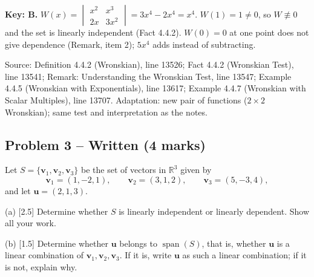 \documentclass[11pt,a4paper]{article}
\newcommand{\Src}[1]{{\footnotesize\color{black!65}Source: #1}}
\begin{document}
\textbf{Key: B.} $W(x)=\begin{vmatrix}x^{2}&x^{3}\\2x&3x^{2}\end{vmatrix}=3x^{4}-2x^{4}=x^{4}$. $W(1)=1\neq0$, so $W\not\equiv0$ and the set is linearly independent (Fact 4.4.2). $W(0)=0$ at one point does not give dependence (Remark, item 2); $5x^4$ adds instead of subtracting.\par
\Src{Definition 4.4.2 (Wronskian), line 13526; Fact 4.4.2 (Wronskian Test), line 13541; Remark: Understanding the Wronskian Test, line 13547; Example 4.4.5 (Wronskian with Exponentials), line 13617; Example 4.4.7 (Wronskian with Scalar Multiples), line 13707. Adaptation: new pair of functions ($2\times2$ Wronskian); same test and interpretation as the notes.}\par
\subsection*{Problem 3 -- Written (4 marks)}
Let $S=\{\mathbf{v}_1,\mathbf{v}_2,\mathbf{v}_3\}$ be the set of vectors in $\mathbb{R}^3$ given by\[\mathbf{v}_1=(1,-2,1),\qquad \mathbf{v}_2=(3,1,2),\qquad \mathbf{v}_3=(5,-3,4),\]and let $\mathbf{u}=(2,1,3)$.\par (a) [2.5] Determine whether $S$ is linearly independent or linearly dependent. Show all your work.\par (b) [1.5] Determine whether $\mathbf{u}$ belongs to $\operatorname{span}(S)$, that is, whether $\mathbf{u}$ is a linear combination of $\mathbf{v}_1,\mathbf{v}_2,\mathbf{v}_3$. If it is, write $\mathbf{u}$ as such a linear combination; if it is not, explain why.\par
\end{document}
